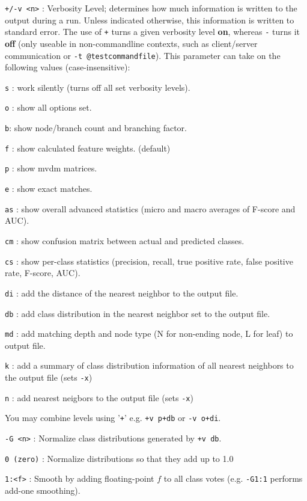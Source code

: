 \documentclass{book}
\begin{document}
\begin{description}
\item {\tt +/-v <n>} : Verbosity Level; determines how much
information is written to the output during a run. Unless indicated
otherwise, this information is written to standard error. The use of
{\tt +} turns a given verbosity level {\bf on}, whereas {\tt -} turns
it {\bf off} (only useable in non-commandline contexts, such as
client/server communication or {\tt -t @testcommandfile}). This
parameter can take on the following values (case-insensitive):

	\begin{description}
         \item {\tt s} :  work silently (turns off all set verbosity levels).
         \item {\tt o} :  show all options set.
         \item {\tt b}: show node/branch count and branching factor.
         \item {\tt f} :  show calculated feature weights. (default)
         \item {\tt p} :  show {\sc mvdm} matrices.
         \item {\tt e} :  show exact matches.
         \item {\tt as} : show overall advanced statistics (micro and macro averages of F-score and AUC).
	 \item {\tt cm} : show confusion matrix between actual and predicted classes.
         \item {\tt cs} : show per-class statistics (precision, recall, true positive rate, false positive rate, F-score, AUC).
         \item {\tt di} : add the distance of the nearest neighbor to the output file.
         \item {\tt db} : add class distribution in the nearest neighbor set to the output file.
         \item {\tt md} : add matching depth and node type (N for non-ending
           node, L for leaf) to output file.
	 \item {\tt k} :  add a summary of class distribution information of all nearest neighbors to the output file (sets {\tt -x})
         \item {\tt n} :  add nearest neigbors to the output file (sets {\tt -x})
	\end{description}

        You may combine levels using '{\tt +}' e.g. {\tt +v p+db} or
        {\tt -v o+di}.

\item {\tt -G <n>} : Normalize class distributions generated by {\tt +v db}.
  \begin{description}
    \item {\tt 0 (zero)} : Normalize distributions so that they add up to 1.0
    \item {\tt 1:<f>} : Smooth by adding floating-point $f$ to all class votes (e.g. {\tt -G1:1} performs add-one smoothing).
  \end{description}


\end{description}
\end{document}
